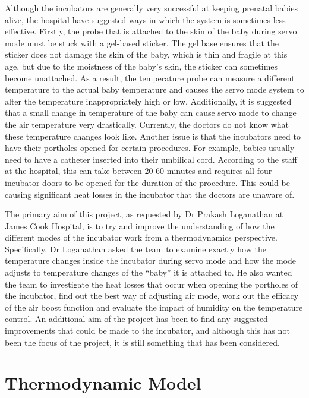 \documentclass{article}
\begin{document}
\vspace{3mm}

Although the incubators are generally very successful at keeping prenatal babies alive, the hospital have suggested ways in which the system is sometimes less effective. Firstly, the probe that is attached to the skin of the baby during servo mode must be stuck with a gel-based sticker. The gel base ensures that the sticker does not damage the skin of the baby, which is thin and fragile at this age, but due to the moistness of the baby’s skin, the sticker can sometimes become unattached. As a result, the temperature probe can measure a different temperature to the actual baby temperature and causes the servo mode system to alter the temperature inappropriately high or low. Additionally, it is suggested that a small change in temperature of the baby can cause servo mode to change the air temperature very drastically. Currently, the doctors do not know what these temperature changes look like. Another issue is that the incubators need to have their portholes opened for certain procedures. For example, babies usually need to have a catheter inserted into their umbilical cord. According to the staff at the hospital, this can take between 20-60 minutes and requires all four incubator doors to be opened for the duration of the procedure. This could be causing significant heat losses in the incubator that the doctors are unaware of.

\vspace{3mm}

The primary aim of this project, as requested by Dr Prakash Loganathan at James Cook Hospital, is to try and improve the understanding of how the different modes of the incubator work from a thermodynamics perspective. Specifically, Dr Loganathan asked the team to examine exactly how the temperature changes inside the incubator during servo mode and how the mode adjusts to temperature changes of the “baby” it is attached to. He also wanted the team to investigate the heat losses that occur when opening the portholes of the incubator, find out the best way of adjusting air mode, work out the efficacy of the air boost function and evaluate the impact of humidity on the temperature control. An additional aim of the project has been to find any suggested improvements that could be made to the incubator, and although this has not been the focus of the project, it is still something that has been considered.

\section{Thermodynamic Model}\label{Thermodynamic}
\end{document}
